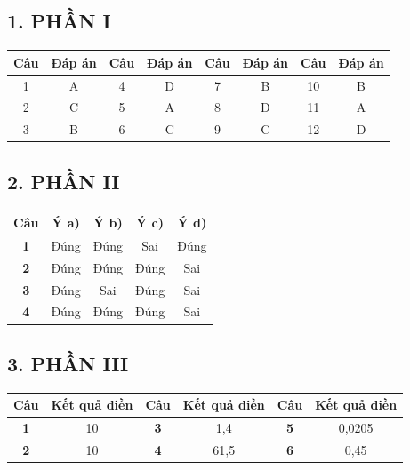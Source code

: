 \documentclass[12pt,a4paper]{article}
\begin{document}
\subsection*{1. PHẦN I}
\begin{center}
\begin{tabular}{|c|c||c|c||c|c||c|c|}
\hline
\textbf{Câu} & \textbf{Đáp án} & \textbf{Câu} & \textbf{Đáp án} & \textbf{Câu} & \textbf{Đáp án} & \textbf{Câu} & \textbf{Đáp án} \\ \hline
1 & A & 4 & D & 7 & B & 10 & B \\ \hline
2 & C & 5 & A & 8 & D & 11 & A \\ \hline
3 & B & 6 & C & 9 & C & 12 & D \\ \hline
\end{tabular}
\end{center}

\subsection*{2. PHẦN II}
\begin{center}
\begin{tabular}{|c|c|c|c|c|}
\hline
\textbf{Câu} & \textbf{Ý a)} & \textbf{Ý b)} & \textbf{Ý c)} & \textbf{Ý d)} \\ \hline
\textbf{1} & Đúng & Đúng & Sai & Đúng \\ \hline
\textbf{2} & Đúng & Đúng & Đúng & Sai \\ \hline
\textbf{3} & Đúng & Sai & Đúng & Sai \\ \hline
\textbf{4} & Đúng & Đúng & Đúng & Sai \\ \hline
\end{tabular}
\end{center}

\subsection*{3. PHẦN III}
\begin{center}
\begin{tabular}{|c|c||c|c||c|c|}
\hline
\textbf{Câu} & \textbf{Kết quả điền} & \textbf{Câu} & \textbf{Kết quả điền} & \textbf{Câu} & \textbf{Kết quả điền} \\ \hline
\textbf{1} & 10 & \textbf{3} & 1,4 & \textbf{5} & 0,0205 \\ \hline
\textbf{2} & 10 & \textbf{4} & 61,5 & \textbf{6} & 0,45 \\ \hline
\end{tabular}
\end{center}
\end{document}
